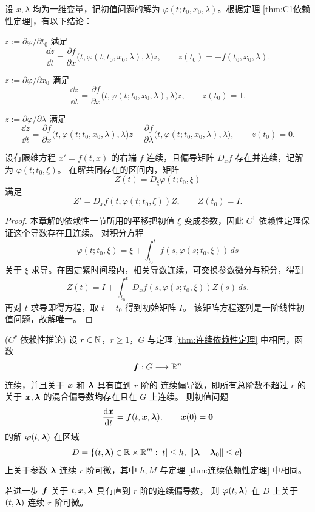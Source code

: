 \begin{corollary}\label{cor:解对初值和参数的偏导方程}
	设 $x,\lambda$ 均为一维变量，记初值问题的解为
	$\varphi(t;t_0,x_0,\lambda)$。根据定理
	\ref{thm:C1依赖性定理}，有以下结论：

	$z\mathrel{:=}\partial\varphi/\partial t_0$ 满足
	\[
		\dfrac{\dd z}{\dd t}
		=\dfrac{\partial f}{\partial x}
		\bigl(t,\varphi(t;t_0,x_0,\lambda),\lambda\bigr)z,
		\qquad
		z(t_0)=-f(t_0,x_0,\lambda).
	\]

	$z\mathrel{:=}\partial\varphi/\partial x_0$ 满足
	\[
		\dfrac{\dd z}{\dd t}
		=\dfrac{\partial f}{\partial x}
		\bigl(t,\varphi(t;t_0,x_0,\lambda),\lambda\bigr)z,
		\qquad
		z(t_0)=1.
	\]

	$z\mathrel{:=}\partial\varphi/\partial\lambda$ 满足
	\[
		\dfrac{\dd z}{\dd t}
		=\dfrac{\partial f}{\partial x}
		\bigl(t,\varphi(t;t_0,x_0,\lambda),\lambda\bigr)z
		+\dfrac{\partial f}{\partial\lambda}
		\bigl(t,\varphi(t;t_0,x_0,\lambda),\lambda\bigr),
		\qquad
		z(t_0)=0.
	\]
\end{corollary}
\begin{proposition}[初值导数的矩阵变分方程]\label{prop:matrix-variation}
设有限维方程 $x'=f(t,x)$ 的右端 $f$ 连续，且偏导矩阵 $D_xf$ 存在并连续，记解为 $\varphi(t;t_0,\xi)$。
在解共同存在的区间内，矩阵
\[
 Z(t)=D_\xi\varphi(t;t_0,\xi)
\]
满足
\[
 Z'=D_xf(t,\varphi(t;t_0,\xi))Z,\qquad Z(t_0)=I.
\]
\end{proposition}
\begin{proof}
本章解的依赖性一节所用的平移把初值 $\xi$ 变成参数，因此 $C^1$ 依赖性定理保证这个导数存在且连续。
对积分方程
\[
 \varphi(t;t_0,\xi)=\xi+\int_{t_0}^t f(s,\varphi(s;t_0,\xi))\,ds
\]
关于 $\xi$ 求导。在固定紧时间段内，相关导数连续，可交换参数微分与积分，得到
\[
 Z(t)=I+\int_{t_0}^tD_xf(s,\varphi(s;t_0,\xi))Z(s)\,ds.
\]
再对 $t$ 求导即得方程，取 $t=t_0$ 得到初始矩阵 $I$。
该矩阵方程逐列是一阶线性初值问题，故解唯一。
\end{proof}

\begin{corollary}($C^r$ 依赖性推论)\label{cor:Cr依赖性推论}
	设 $r\in\mathbb{N}$，$r\geq1$，$G$ 与定理
	\ref{thm:连续依赖性定理} 中相同，函数
	\[
	\boldsymbol{f}:G\longrightarrow\mathbb{R}^n
	\]
	连续，并且关于 $\boldsymbol{x}$ 和 $\boldsymbol{\lambda}$ 具有直到 $r$ 阶的
	连续偏导数，即所有总阶数不超过 $r$ 的关于
	$\boldsymbol{x},\boldsymbol{\lambda}$ 的混合偏导数均存在且在 $G$ 上连续。
	则初值问题
	\[
	\frac{\mathrm{d}\boldsymbol{x}}{\mathrm{d} t}
	=
	\boldsymbol{f}(t,\boldsymbol{x},\boldsymbol{\lambda}),
	\qquad
	\boldsymbol{x}(0)=\boldsymbol{0}
	\]
	的解 $\boldsymbol{\varphi}(t,\boldsymbol{\lambda})$ 在区域
	\[
	D=
	\left\{
	(t,\boldsymbol{\lambda})\in\mathbb{R}\times\mathbb{R}^m:
	\left| t \right|\leq h,\;
	\left\| \boldsymbol{\lambda}-\boldsymbol{\lambda}_0 \right\|\leq c
	\right\}
	\]
	上关于参数 $\boldsymbol{\lambda}$ 连续 $r$ 阶可微，其中 $h,M$
	与定理 \ref{thm:连续依赖性定理} 中相同。
	
	若进一步 $\boldsymbol{f}$ 关于
	$t,\boldsymbol{x},\boldsymbol{\lambda}$ 具有直到 $r$ 阶的连续偏导数，
	则 $\boldsymbol{\varphi}(t,\boldsymbol{\lambda})$ 在 $D$ 上关于
	$(t,\boldsymbol{\lambda})$ 连续 $r$ 阶可微。
\end{corollary}

